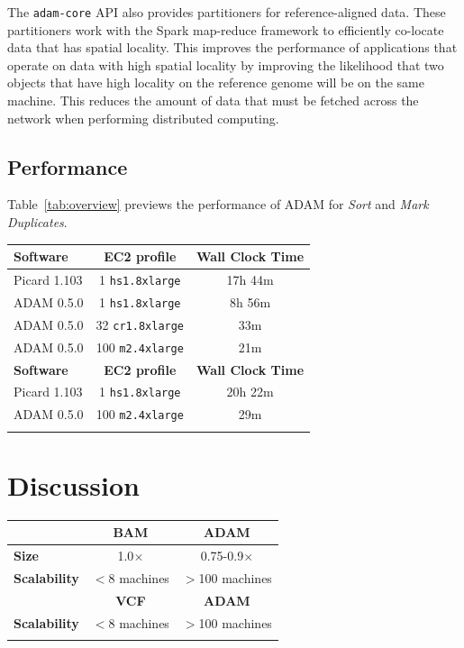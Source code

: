 \documentclass{bioinfo}
\begin{document}
The \texttt{adam-core} API also provides partitioners for reference-aligned data. These partitioners work with the Spark map-reduce framework to efficiently co-locate data that
has spatial locality. This improves the performance of applications that operate on data with high spatial locality by improving the likelihood that two objects that have high
locality on the reference genome will be on the same machine. This reduces the amount of data that must be fetched across the network when performing distributed computing.

\subsection{Performance}
\label{sec:performance}

Table~\ref{tab:overview} previews the performance of ADAM for \textit{Sort} and \textit{Mark Duplicates}.

\begin{table}[h]
{\begin{tabular}{ l c c }
\toprule
\bf Software & \bf EC2 profile & \bf Wall Clock Time \\
\midrule
Picard 1.103 & 1 \texttt{hs1.8xlarge} & 17h 44m \\
ADAM 0.5.0 & 1 \texttt{hs1.8xlarge} & 8h 56m \\
ADAM 0.5.0 & 32 \texttt{cr1.8xlarge} & 33m \\
ADAM 0.5.0 & 100 \texttt{m2.4xlarge} & 21m \\ 
\midrule
\bf Software & \bf EC2 profile & \bf Wall Clock Time \\
\midrule
Picard 1.103 & 1 \texttt{hs1.8xlarge} & 20h 22m \\
ADAM 0.5.0 & 100 \texttt{m2.4xlarge} & 29m \\
\botrule
\end{tabular}}{}
\end{table}

\section{Discussion}
\label{sec:discussion}

\begin{table}[h]
{\begin{tabular}{ l c c }
\toprule
 & \bf BAM & \bf ADAM \\
\midrule
\bf Size & 1.0$\times$ & 0.75-0.9$\times$ \\
\bf Scalability & $<$8 machines & $>$100 machines \\
\midrule
& \bf VCF & \bf ADAM \\
\midrule
\bf Scalability & $<$8 machines & $>$100 machines \\
\botrule
\end{tabular}}{}
\end{table}
\end{document}
